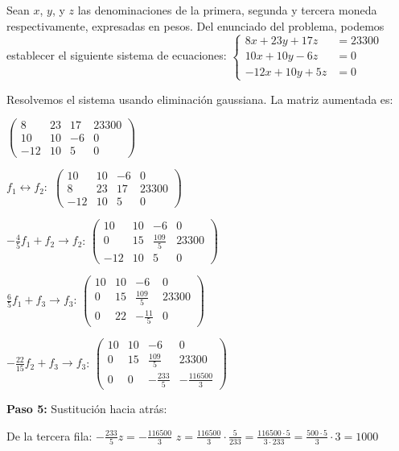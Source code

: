 \begin{myproof} Sean $x$, $y$, y $z$ las denominaciones de la primera, segunda y tercera moneda respectivamente, expresadas en pesos. Del enunciado del problema, podemos establecer el siguiente sistema de ecuaciones: $\begin{cases}
8x + 23y + 17z &= 23300  \\
10x + 10y - 6z &= 0  \\
-12x + 10y + 5z &= 0 
\end{cases}$

Resolvemos el sistema usando eliminación gaussiana. La matriz aumentada es:

$\left(\begin{array}{ccc|c}
8 & 23 & 17 & 23300 \\
10 & 10 & -6 & 0 \\
-12 & 10 & 5 & 0
\end{array}\right)$

$f_1 \leftrightarrow f_2:$ $\left(\begin{array}{ccc|c}
10 & 10 & -6 & 0 \\
8 & 23 & 17 & 23300 \\
-12 & 10 & 5 & 0
\end{array}\right)$

$-\frac{4}{5}f_1 + f_2 \to f_2$: $\left(\begin{array}{ccc|c}
10 & 10 & -6 & 0 \\
0 & 15 & \frac{109}{5} & 23300 \\
-12 & 10 & 5 & 0
\end{array}\right)$

$\frac{6}{5}f_1 + f_3 \to f_3$: $\left(\begin{array}{ccc|c}
10 & 10 & -6 & 0 \\
0 & 15 & \frac{109}{5} & 23300 \\
0 & 22 & -\frac{11}{5} & 0
\end{array}\right)$

$-\frac{22}{15}f_2 + f_3 \to f_3$: $\left(\begin{array}{ccc|c}
10 & 10 & -6 & 0 \\
0 & 15 & \frac{109}{5} & 23300 \\
0 & 0 & -\frac{233}{5} & -\frac{116500}{3}
\end{array}\right)$

\textbf{Paso 5:} Sustitución hacia atrás:


De la tercera fila: $-\frac{233}{5}z = -\frac{116500}{3}$
$z = \frac{116500}{3} \cdot \frac{5}{233} = \frac{116500 \cdot 5}{3 \cdot 233} = \frac{500 \cdot 5}{3} \cdot 3 = 1000$


\end{myproof}
